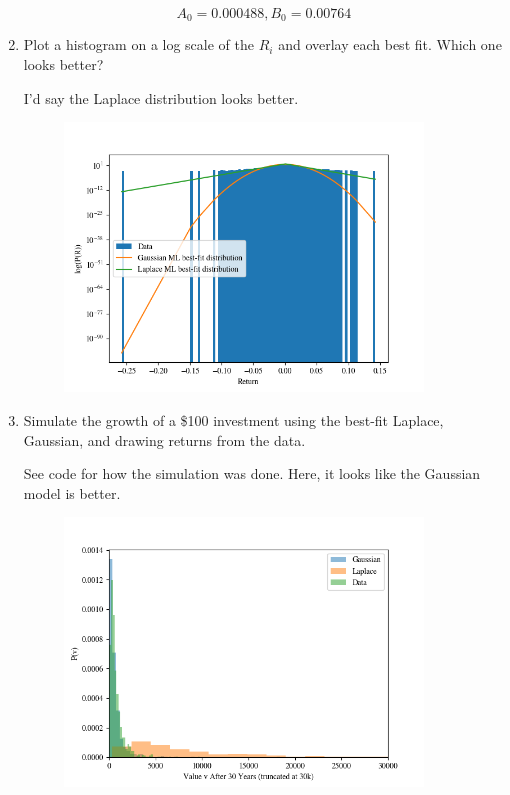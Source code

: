 \begin{enumerate}[label=\textbf{\Alph*}.]
    $$A_0=0.000488, B_0=0.00764$$

    \newpage
    \item Plot a histogram on a log scale of the $R_i$ and overlay each best fit. Which one looks better?

    I'd say the Laplace distribution looks better.
    \begin{figure}[H]
        \begin{center}
            \includegraphics[width=0.9\textwidth]{images/q1_return_hist.png}
        \end{center}
    \end{figure}
    \newpage
    \item Simulate the growth of a \$100 investment using the best-fit Laplace, Gaussian, and drawing returns from the data.

    See code for how the simulation was done. Here, it looks like the Gaussian model is better.
    \begin{figure}[H]
        \begin{center}
            \includegraphics[width=0.9\textwidth]{images/q1_generator_comparison.png}
        \end{center}
    \end{figure}

\end{enumerate}
